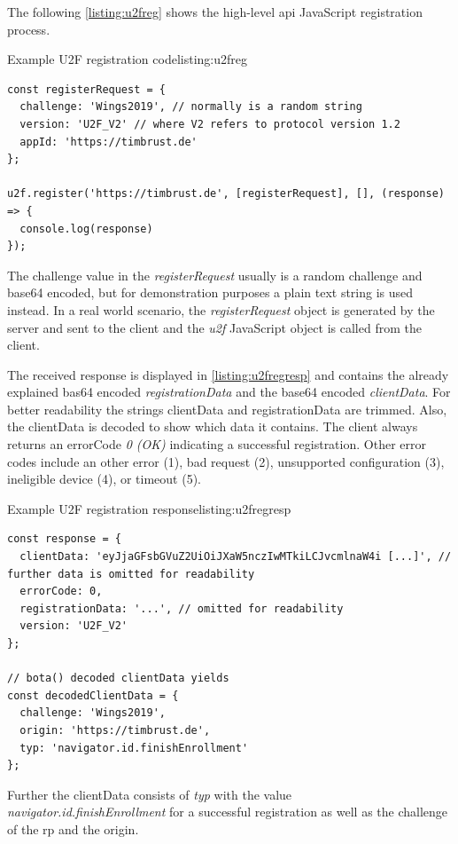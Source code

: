 The following \autoref{listing:u2freg} shows the high-level \gls{api} JavaScript registration process.
\\
\begin{example}{Example U2F registration code}{listing:u2freg}
\begin{verbatim}
const registerRequest = {
  challenge: 'Wings2019', // normally is a random string
  version: 'U2F_V2' // where V2 refers to protocol version 1.2
  appId: 'https://timbrust.de'
};

u2f.register('https://timbrust.de', [registerRequest], [], (response) => {
  console.log(response)
});
\end{verbatim}
\end{example}

The challenge value in the \textit{registerRequest} usually is a random challenge and base64 encoded, but for demonstration purposes a plain text string is used instead. In a real world scenario, the \textit{registerRequest} object is generated by the server and sent to the client and the \textit{u2f} JavaScript object is called from the client.

The received response is displayed in \autoref{listing:u2fregresp} and contains the already explained bas64 encoded \textit{registrationData} and the base64 encoded \textit{clientData}. For better readability the strings clientData and registrationData are trimmed. Also, the clientData is decoded to show which data it contains. The client always returns an errorCode \textit{0 (OK)} indicating a successful registration. Other error codes include an other error (1), bad request (2), unsupported configuration (3), ineligible device (4), or timeout (5).

\begin{example}{Example U2F registration response}{listing:u2fregresp}
\begin{verbatim}
const response = {
  clientData: 'eyJjaGFsbGVuZ2UiOiJXaW5nczIwMTkiLCJvcmlnaW4i [...]', // further data is omitted for readability
  errorCode: 0,
  registrationData: '...', // omitted for readability
  version: 'U2F_V2'
};

// bota() decoded clientData yields
const decodedClientData = {
  challenge: 'Wings2019',
  origin: 'https://timbrust.de',
  typ: 'navigator.id.finishEnrollment'
};
\end{verbatim}
\end{example}

Further the clientData consists of \textit{typ} with the value \textit{navigator.id.finishEnrollment} for a successful registration as well as the challenge of the \gls{rp} and the origin.

